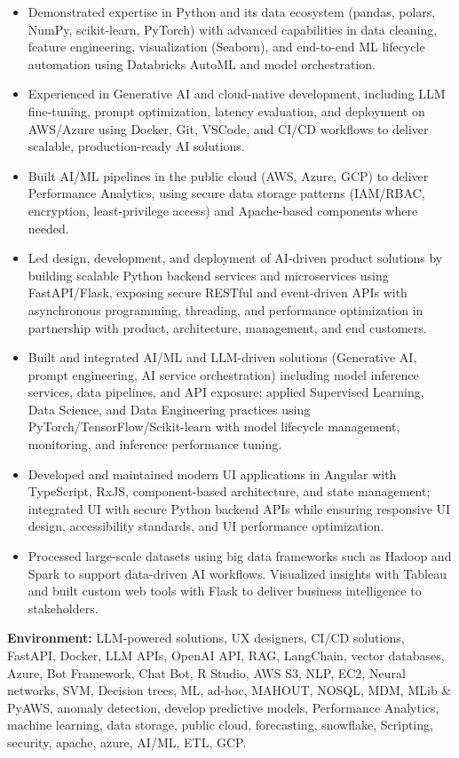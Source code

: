 \begin{itemize}
  \item Demonstrated expertise in Python and its data ecosystem (pandas, polars, NumPy, scikit-learn,
        PyTorch) with advanced capabilities in data cleaning, feature engineering, visualization
        (Seaborn), and end-to-end ML lifecycle automation using Databricks AutoML and model
        orchestration.

  \item Experienced in Generative AI and cloud-native development, including LLM fine-tuning,
        prompt optimization, latency evaluation, and deployment on AWS/Azure using Docker, Git,
        VSCode, and CI/CD workflows to deliver scalable, production-ready AI solutions.

  \item Built AI/ML pipelines in the public cloud (AWS, Azure, GCP) to deliver Performance
        Analytics, using secure data storage patterns (IAM/RBAC, encryption, least-privilege
        access) and Apache-based components where needed.

  \item Led design, development, and deployment of AI-driven product solutions by building scalable
        Python backend services and microservices using FastAPI\slash Flask, exposing secure RESTful and
        event-driven APIs with asynchronous programming, threading, and performance optimization in
        partnership with product, architecture, management, and end customers.

  \item Built and integrated AI/ML and LLM-driven solutions (Generative AI, prompt engineering,
        AI service orchestration) including model inference services, data pipelines, and API
        exposure; applied Supervised Learning, Data Science, and Data Engineering practices using
        PyTorch/TensorFlow/Scikit-learn with model lifecycle management, monitoring, and inference
        performance tuning.

  \item Developed and maintained modern UI applications in Angular with TypeScript, RxJS,
        component-based architecture, and state management; integrated UI with secure Python backend
        APIs while ensuring responsive UI design, accessibility standards, and UI performance
        optimization.

  \item Processed large-scale datasets using big data frameworks such as Hadoop and Spark to support
        data-driven AI workflows. Visualized insights with Tableau and built custom web tools with
        Flask to deliver business intelligence to stakeholders.
\end{itemize}

\textbf{Environment:} LLM-powered solutions, UX designers, CI/CD solutions, FastAPI, Docker, LLM APIs,
OpenAI API, RAG, LangChain, vector databases, Azure, Bot Framework, Chat Bot, R Studio, AWS S3, NLP,
EC2, Neural networks, SVM, Decision trees, ML, ad-hoc, MAHOUT, NOSQL, MDM, MLib \& PyAWS, anomaly
detection, develop predictive models, Performance Analytics, machine learning, data storage, public
cloud, forecasting, snowflake, Scripting, security, apache, azure, AI/ML, ETL, GCP.
